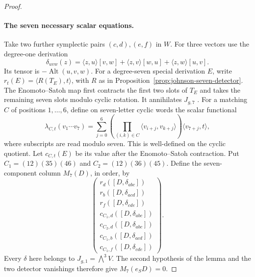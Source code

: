 \documentclass[11pt]{article}
\theoremstyle{definition}\newtheorem{definition}[theorem]{Definition}
\begin{document}
\begin{proof}
\paragraph{The seven necessary scalar equations.}
Take two further symplectic pairs $(c,d),(e,f)$ in $W$.
For three vectors use the degree-one derivation
\[
 \delta_{uvw}(z)=\langle z,u\rangle[v,w]
          +\langle z,v\rangle[w,u]
          +\langle z,w\rangle[u,v].
\]
Its tensor is $-\operatorname{Alt}(u,v,w)$.
For a degree-seven special derivation $E$, write
$r_t(E)=\langle R(T_E),t\rangle$, with $R$ as in
Proposition~\ref{prop:johnson-seven-detector}.
The Enomoto--Satoh map first contracts the first two
slots of $T_E$ and takes the remaining seven slots
modulo cyclic rotation. It annihilates $J_{g,7}$
\cite[diagram (2), p.~640; \S7.1, p.~656]{EnomotoSatoh2014}.
For a matching $C$ of positions $1,\ldots,6$, define
on seven-letter cyclic words the scalar functional
\[
 \lambda_{C,t}(v_1\cdots v_7)
  =\sum_{j=0}^6
       \left(\prod_{(i,k)\in C}
          \langle v_{i+j},v_{k+j}\rangle\right)
                 \langle v_{7+j},t\rangle,
\]
where subscripts are read modulo seven. This is
well-defined on the cyclic quotient. Let $c_{C,t}(E)$
be its value after the Enomoto--Satoh contraction.
Put $C_1=(12)(35)(46)$ and $C_2=(12)(36)(45)$.
Define the seven-component column $M_7(D)$, in order, by
\[
\begin{pmatrix}
r_d([D,\delta_{abc}])\\
r_b([D,\delta_{acd}])\\
r_f([D,\delta_{cde}])\\
c_{C_1,d}([D,\delta_{abc}])\\
c_{C_2,d}([D,\delta_{abc}])\\
c_{C_1,b}([D,\delta_{acd}])\\
c_{C_1,f}([D,\delta_{cde}])
\end{pmatrix}.
\]
Every $\delta$ here belongs to $J_{g,1}=\bigwedge^3V$.
The second hypothesis of the lemma and the two detector
vanishings therefore give $M_7(e_SD)=0$.


\end{proof}
\end{document}
